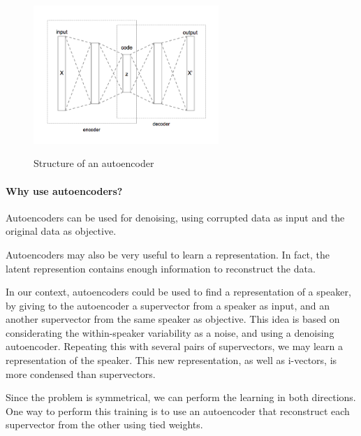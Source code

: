 \documentclass[conference]{IEEEtran}
\begin{document}

\begin{figure}[!h]
    \centering
    \caption{Structure of an autoencoder}
    \includegraphics[width=7cm]{Autoencoder_structure.png}
    \label{autoencoder_structure}
\end{figure}


\paragraph{Why use autoencoders?}

Autoencoders can be used for denoising, using corrupted data as input and the original data as objective.

Autoencoders may also be very useful to learn a representation. In fact, the latent represention contains enough information to reconstruct the data.

In our context, autoencoders could be used to find a representation of a speaker, by giving to the autoencoder a supervector from a speaker as input, and an another supervector from the same speaker as objective. This idea is based on considerating the within-speaker variability as a noise, and using a denoising autoencoder. Repeating this with several pairs of supervectors, we may learn a representation of the speaker. This new representation, as well as i-vectors, is more condensed than supervectors.

Since the problem is symmetrical, we can perform the learning in both directions. One way to perform this training is to use an autoencoder that reconstruct each supervector from the other using tied weights.
\end{document}
